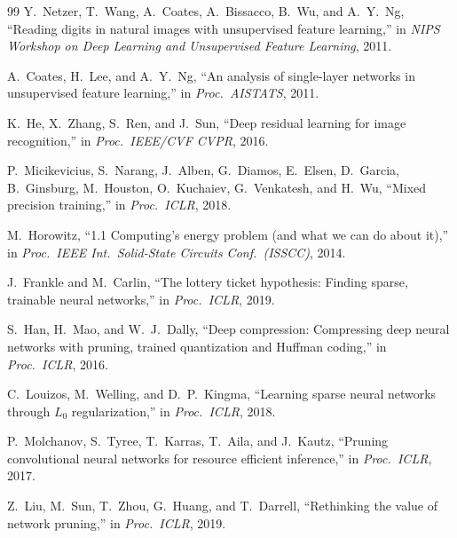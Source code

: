 \documentclass[12pt]{article}
\begin{document}
\begin{thebibliography}{99}
Y.\ Netzer, T.\ Wang, A.\ Coates, A.\ Bissacco, B.\ Wu, and A.\ Y.\ Ng,
``Reading digits in natural images with unsupervised feature learning,''
in \textit{NIPS Workshop on Deep Learning and Unsupervised Feature Learning}, 2011.

A.\ Coates, H.\ Lee, and A.\ Y.\ Ng,
``An analysis of single-layer networks in unsupervised feature learning,''
in \textit{Proc.\ AISTATS}, 2011.

K.\ He, X.\ Zhang, S.\ Ren, and J.\ Sun,
``Deep residual learning for image recognition,''
in \textit{Proc.\ IEEE/CVF CVPR}, 2016.

P.\ Micikevicius, S.\ Narang, J.\ Alben, G.\ Diamos, E.\ Elsen, D.\ Garcia, B.\ Ginsburg, M.\ Houston, O.\ Kuchaiev, G.\ Venkatesh, and H.\ Wu,
``Mixed precision training,''
in \textit{Proc.\ ICLR}, 2018.

M.\ Horowitz,
``1.1 Computing's energy problem (and what we can do about it),''
in \textit{Proc.\ IEEE Int.\ Solid-State Circuits Conf.\ (ISSCC)}, 2014.

J.\ Frankle and M.\ Carlin,
``The lottery ticket hypothesis: Finding sparse, trainable neural networks,''
in \textit{Proc.\ ICLR}, 2019.

S.\ Han, H.\ Mao, and W.\ J.\ Dally,
``Deep compression: Compressing deep neural networks with pruning, trained quantization and Huffman coding,''
in \textit{Proc.\ ICLR}, 2016.

C.\ Louizos, M.\ Welling, and D.\ P.\ Kingma,
``Learning sparse neural networks through $L_0$ regularization,''
in \textit{Proc.\ ICLR}, 2018.

P.\ Molchanov, S.\ Tyree, T.\ Karras, T.\ Aila, and J.\ Kautz,
``Pruning convolutional neural networks for resource efficient inference,''
in \textit{Proc.\ ICLR}, 2017.

Z.\ Liu, M.\ Sun, T.\ Zhou, G.\ Huang, and T.\ Darrell,
``Rethinking the value of network pruning,''
in \textit{Proc.\ ICLR}, 2019.

\end{thebibliography}
\end{document}
